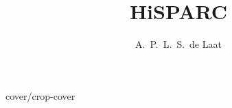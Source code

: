 \title{HiSPARC}
\author{A.~P.~L.~S.~de Laat}




\makeatletter

           {cover/crop-cover}
\makeatother

\thispagestyle{empty}
\cleardoublepage

\frontmatter



\cleardoublepage

\vspace*{1in}

\hfill
\parbox{5cm}{
}

\tableofcontents

\mainmatter
\renewcommand{\epigraphflush}{flushleft}


\backmatter

%
\printbibliography
%


